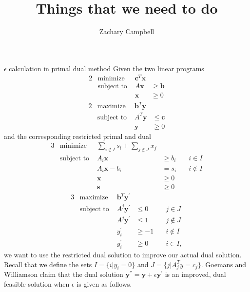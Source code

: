 \documentclass[11pt]{article}
\renewcommand{\'}{^{'}}
\begin{document}
\title{Things that we need to do}
\author{Zachary Campbell}

\maketitle

\begin{section}{$\epsilon$ calculation in primal dual method}
	Given the two linear programs 
	\begin{alignat}{2}
		& \text{minimize} & \mathbf{c}^{T}\mathbf{x} \\
		& \text{subject to } & A\mathbf{x} & \geq \mathbf{b} \\
		&& \mathbf{x} & \geq 0
	\end{alignat}
	\begin{alignat}{2}
		& \text{maximize} & \mathbf{b}^{T}\mathbf{y} \\
		& \text{subject to } & A^{T}\mathbf{y} & \leq \mathbf{c} \\
		&& \mathbf{y} & \geq 0
	\end{alignat}
	and the corresponding restricted primal and dual
	\begin{alignat}{3}
		& \text{minimize } & \sum_{i\notin I} s_i + \sum_{j\notin J} x_j \\
		& \text{subject to } & A_i\mathbf{x} & \geq b_i & \quad i\in I \\
				     && A_i\mathbf{x} - b_i & = s_i & \quad i\notin I\\
				     && \mathbf{x} & \geq 0\\
				     && \mathbf{s} & \geq 0
	\end{alignat}
	\begin{alignat}{3}
		& \text{maximize } & \mathbf{b}^{T}\mathbf{y}\'  \\
		& \text{subject to } & A^{j}\mathbf{y}\' & \leq 0 & \quad j\in J \\
				     && A^{j}\mathbf{y}\' & \leq 1 & \quad j\notin J \\
				     && y_i\' & \geq -1 & \quad i\notin I \\
				     && y_i\' & \geq 0 & \quad i\in I,
	\end{alignat}
	we want to use the restricted dual solution to improve our actual dual solution.
	Recall that we define the sets $I = \{i | y_i = 0\}$ and $J = \{j | A^{T}_j y = c_j\}$.
	Goemans and Williamson claim that the dual solution $\mathbf{y}^{''} = \mathbf{y} + \epsilon 
	\mathbf{y}^{'}$ is an improved, dual feasible solution when $\epsilon$ is given as follows. 

\end{section}
\end{document}

